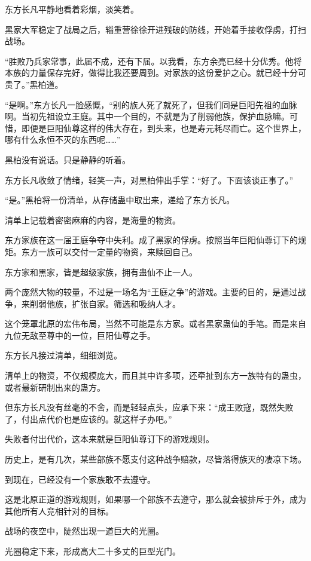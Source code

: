 \begin{this_body}
东方长凡平静地看着彩烟，淡笑着。

黑家大军稳定了战局之后，辎重营徐徐开进残破的防线，开始着手接收俘虏，打扫战场。

“胜败乃兵家常事，此届不成，还有下届。以我看，东方余亮已经十分优秀。他将本族的力量保存完好，做得比我还要周到。对家族的这份爱护之心。就已经十分可贵了。”黑柏道。

“是啊。”东方长凡一脸感慨，“别的族人死了就死了，但我们同是巨阳先祖的血脉啊。当初先祖设立王庭。其中一个目的，不就是为了削弱他族，保护血脉嘛。可惜，即便是巨阳仙尊这样的伟大存在，到头来，也是寿元耗尽而亡。这个世界上，哪有什么永恒不灭的东西呢……”

黑柏没有说话。只是静静的听着。

东方长凡收敛了情绪，轻笑一声，对黑柏伸出手掌：“好了。下面该谈正事了。”

“是。”黑柏将一份清单，从存储蛊中取出来，递给了东方长凡。

清单上记载着密密麻麻的内容，是海量的物资。

东方家族在这一届王庭争夺中失利。成了黑家的俘虏。按照当年巨阳仙尊订下的规矩。东方一族可以交付一定量的物资，来赎回自己。

东方家和黑家，皆是超级家族，拥有蛊仙不止一人。

两个庞然大物的较量，不过是一场名为“王庭之争”的游戏。主要的目的，是通过战争，来削弱他族，扩张自家。筛选和吸纳人才。

这个笼罩北原的宏伟布局，当然不可能是东方家。或者黑家蛊仙的手笔。而是来自九位无敌至尊中的一位，巨阳仙尊之手。

东方长凡接过清单，细细浏览。

清单上的物资，不仅规模庞大，而且其中许多项，还牵扯到东方一族特有的蛊虫，或者最新研制出来的蛊方。

但东方长凡没有丝毫的不舍，而是轻轻点头，应承下来：“成王败寇，既然失败了，付出点代价也是应该的。就这样子办吧。”

失败者付出代价，这本来就是巨阳仙尊订下的游戏规则。

历史上，是有几次，某些部族不愿支付这种战争赔款，尽皆落得族灭的凄凉下场。

到现在，已经没有一个家族敢不去遵守。

这是北原正道的游戏规则，如果哪一个部族不去遵守，那么就会被排斥于外，成为其他所有人竞相针对的目标。

战场的夜空中，陡然出现一道巨大的光圈。

光圈稳定下来，形成高大二十多丈的巨型光门。


\end{this_body}
